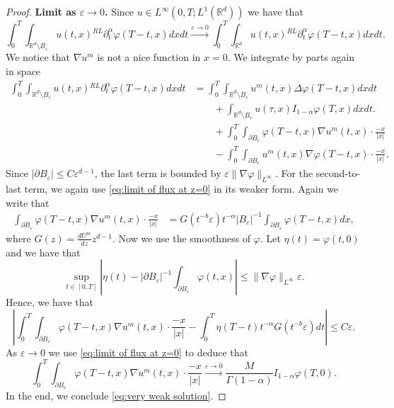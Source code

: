 \documentclass[a4paper]{article}
\theoremstyle{definition}
\newcommand{\Rd}{{\mathbb{R}^d}}
\newcommand{\dRL}{{^{RL}\partial_t^\alpha}}
\begin{document}
\begin{proof}
  \textbf{Limit as $\varepsilon \to 0$.} %
  Since $u \in L^\infty(0,T; L^1 (\mathbb R^{d}))$ we have that
  \[
    \int_{0}^T \int_{\Rd \setminus B_\varepsilon} u(t,x) \dRL \varphi (T-t,x)dxdt
    \overset{\varepsilon \to 0} \longrightarrow
    \int_{0}^T \int_{\Rd} u(t,x) \dRL \varphi (T-t,x)dxdt.
  \]
  We notice that $\nabla u^m$ is not a nice function in $x = 0$. We integrate by parts again in space
  \begin{align*}
    \int_0^T \int_{\Rd \setminus B_\varepsilon} u(t,x) \dRL \varphi (T-t,x)dxdt
    & =
    \int_0^{T} \int_{\mathbb R^d \setminus B_\varepsilon} u^{m} (t,x) \Delta \varphi (T- t,x) dxdt
    \\
    & \qquad
    + \int_{\Rd \setminus B_\varepsilon} u(\tau,x) I_{1-\alpha} \varphi (T,x)dxdt.
    \\
    & \qquad
    + \int_0 ^T \int_{\partial B_\varepsilon} \varphi(T-t,x) \nabla u^{m}(t,x) \cdot {\frac{-x}{|x|}}
    \\
    & \qquad
    -
    \int_0^T \int_{\partial B_\varepsilon} u^{m}(t,x) \nabla \varphi(T-t,x) \cdot {\frac{-x}{|x|}}.
  \end{align*}
  Since $|\partial B_\varepsilon| \le C \varepsilon^{d-1}$, the last term is bounded by $\varepsilon \|\nabla \varphi\|_{L^\infty}$.
  For the second-to-last term, we again use \eqref{eq:limit of flux at z=0} in its weaker form.
  Again we write that
  \begin{align*}
    \int_{\partial B_\varepsilon} \varphi(T-t,x) \nabla u^{m}(t,x) \cdot \frac{-x}{|x|}
    & = G(t^{-b}\varepsilon) t^{-\alpha} |B_\varepsilon|^{-1} \int_{\partial B_\varepsilon} \varphi(T-t, x) dx
    ,
  \end{align*}
  where
  $G(z) = \frac{dU^{m}}{dz} z^{d-1}$.
  Now we use the smoothness of $\varphi$. Let $\eta(t) = \varphi(t,0)$ and we have that
  \begin{equation*}
    \sup_{t\in [0,T]} \left| \eta(t) - |\partial B_\varepsilon|^{-1} \int_{\partial B_\varepsilon} \varphi(t,x) \right| \le \|\nabla \varphi\|_{L^\infty} \varepsilon.
  \end{equation*}
  Hence, we have that
  \begin{equation*}
    \left| \int_0^T \int_{\partial B_\varepsilon} \varphi(T-t,x) \nabla u^{m}(t,x) \cdot \frac{-x}{|x|} - \int_0^T \eta(T-t) t^{-\alpha} G(t^{-b} \varepsilon) dt \right|  \le C \varepsilon.
  \end{equation*}
  As $\varepsilon \to 0$ we use \eqref{eq:limit of flux at z=0} to deduce that
  \[
    \int_0^T \int_{\partial B_\varepsilon} \varphi(T-t,x) \nabla u^{m}(t,x) \cdot \frac{-x}{|x|} \overset{\varepsilon \to 0} \longrightarrow \frac{M}{\Gamma(1-\alpha)} I_{1-\alpha} \varphi(T,0).
  \]
  In the end, we conclude \eqref{eq:very weak solution}.
\end{proof}
\end{document}
